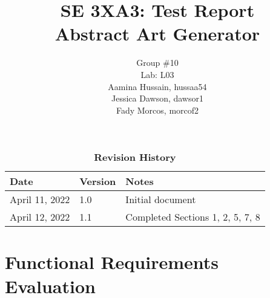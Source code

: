 \documentclass[12pt, titlepage]{article}
\title{SE 3XA3: Test Report\\Abstract Art Generator}
\author{Group \#10
        \\Lab: L03
		\\ Aamina Hussain, hussaa54
		\\ Jessica Dawson, dawsor1
		\\ Fady Morcos, morcof2
}
\date{}
\begin{document}
\maketitle

\tableofcontents
\listoftables
\listoffigures

\begin{table}[h!]
\caption{\bf Revision History}
\begin{tabularx}{\textwidth}{p{3cm}p{2cm}X}
\toprule {\bf Date} & {\bf Version} & {\bf Notes}\\
\midrule
April 11, 2022 & 1.0 & Initial document\\
April 12, 2022 & 1.1 & Completed Sections 1, 2, 5, 7, 8\\
\bottomrule
\end{tabularx}
\end{table}

\newpage


\section{Functional Requirements Evaluation}
\end{document}
